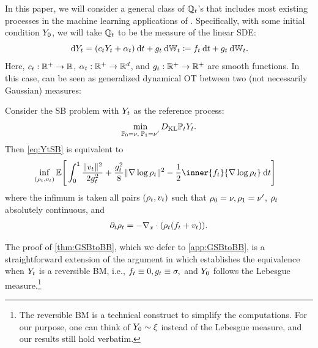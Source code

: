 In this paper, we will consider a general class of $\refpro$'s that includes most existing processes in the machine learning applications of . Specifically, with some initial condition $\refsde[0]$, we will take $\refpro$ to be the measure of the linear \acrfull{SDE}:
\begin{equation}
\label{eq:linearsde}
\drefsde = \parens*{\drift \refsde  + \shift }\dd t + \volat \dWiener[\ctime] \defeq \driftf\dt + \volat \dWiener[\ctime].
\end{equation}
Here, $\drift: \R^+ \to \R$, $\shift : \R^+ \to \R^\vdim$, and $\volat: \R^+ \to \R^+$ are smooth functions. In this case,  can be seen as generalized dynamical \acrshort{OT} between two (not necessarily Gaussian) measures:
\begin{theorem}
\label{thm:GSBtoBB}
Consider the \acrlong{SB} problem with $\refsde$ as the reference process: 
\begin{equation}
\label{eq:YtSB}
\min_{ \substack{ \Pinit = \nu, \; \Pend = \nu'} } \KL{\Pmargin}{\refsde}.%
\end{equation}
Then \eqref{eq:YtSB} is equivalent to
\begin{align}
\label{eq:dynamicGSB}
&\inf_{(\measure,\vect)} \mathbb{E}\Bigg[\int_0^\horizon  \frac{\norm{\vect}^2}{2\volatsq[\ctime]} + \frac{\volatsq[\ctime]}{8} \norm{\nabla \log \measure}^2  - \frac{1}{2} \inner{\driftf}{\nabla \log\measure} \dt\Bigg]
\end{align}where the infimum is taken all pairs $(\measure,\vect)$ such that $\measure[0] = \nu, \measure[\horizon] = \nu'$, $\measure$ absolutely continuous, and
\begin{align}
\label{eq:Coneq2}
\partial_t \measure = -\Div \parens*{  \measure\parens*{ \driftf + \vect}  }.
\end{align}
\end{theorem}
The proof of \cref{thm:GSBtoBB}, which we defer to \cref{app:GSBtoBB}, is a straightforward extension of the argument in \citep{leonard2013survey, chen2016relation, gentil2017analogy} which establishes the equivalence when $\refsde$ is a reversible \acrlong{BM}, i.e., $\driftf \equiv0, \volat[\ctime] \equiv \sigma,$ and $\refsde[0]$ follows the Lebesgue measure.\footnote{The reversible \acrlong{BM} is a technical construct to simplify the computations. For our purpose, one can think of $\refsde[0]\sim \xi$ instead of the Lebesgue measure, and our results still hold verbatim.}  


